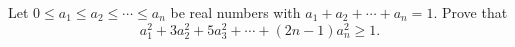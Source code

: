 Let $0\le a_1\le a_2\le\cdots\le a_n$ be real numbers with $a_1+a_2+\cdots+a_n=1$. Prove that
\[a_1^2+3a_2^2+5a_3^2+\cdots+(2n-1)a_n^2\ge1.\]
